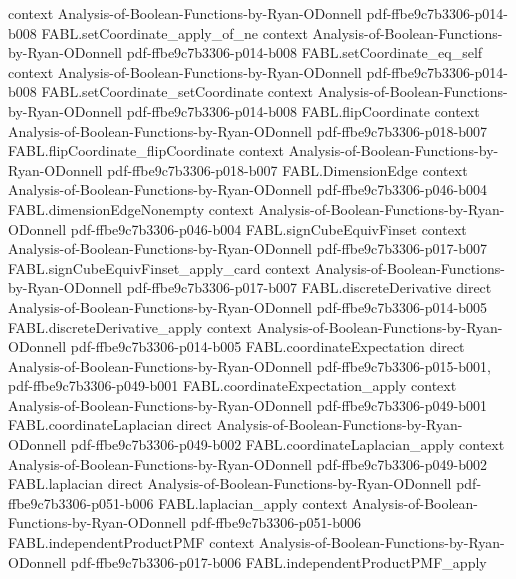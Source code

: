 \begin{theorem}
  {context}
  {Analysis-of-Boolean-Functions-by-Ryan-ODonnell}
  {pdf-ffbe9c7b3306-p014-b008}
\proofstep
  {FABL.setCoordinate_apply_of_ne}
  {context}
  {Analysis-of-Boolean-Functions-by-Ryan-ODonnell}
  {pdf-ffbe9c7b3306-p014-b008}
\proofstep
  {FABL.setCoordinate_eq_self}
  {context}
  {Analysis-of-Boolean-Functions-by-Ryan-ODonnell}
  {pdf-ffbe9c7b3306-p014-b008}
\proofstep
  {FABL.setCoordinate_setCoordinate}
  {context}
  {Analysis-of-Boolean-Functions-by-Ryan-ODonnell}
  {pdf-ffbe9c7b3306-p014-b008}
\proofstep
  {FABL.flipCoordinate}
  {context}
  {Analysis-of-Boolean-Functions-by-Ryan-ODonnell}
  {pdf-ffbe9c7b3306-p018-b007}
\proofstep
  {FABL.flipCoordinate_flipCoordinate}
  {context}
  {Analysis-of-Boolean-Functions-by-Ryan-ODonnell}
  {pdf-ffbe9c7b3306-p018-b007}
\proofstep
  {FABL.DimensionEdge}
  {context}
  {Analysis-of-Boolean-Functions-by-Ryan-ODonnell}
  {pdf-ffbe9c7b3306-p046-b004}
\proofstep
  {FABL.dimensionEdgeNonempty}
  {context}
  {Analysis-of-Boolean-Functions-by-Ryan-ODonnell}
  {pdf-ffbe9c7b3306-p046-b004}
\proofstep
  {FABL.signCubeEquivFinset}
  {context}
  {Analysis-of-Boolean-Functions-by-Ryan-ODonnell}
  {pdf-ffbe9c7b3306-p017-b007}
\proofstep
  {FABL.signCubeEquivFinset_apply_card}
  {context}
  {Analysis-of-Boolean-Functions-by-Ryan-ODonnell}
  {pdf-ffbe9c7b3306-p017-b007}
\proofstep
  {FABL.discreteDerivative}
  {direct}
  {Analysis-of-Boolean-Functions-by-Ryan-ODonnell}
  {pdf-ffbe9c7b3306-p014-b005}
\proofstep
  {FABL.discreteDerivative_apply}
  {context}
  {Analysis-of-Boolean-Functions-by-Ryan-ODonnell}
  {pdf-ffbe9c7b3306-p014-b005}
\proofstep
  {FABL.coordinateExpectation}
  {direct}
  {Analysis-of-Boolean-Functions-by-Ryan-ODonnell}
  {pdf-ffbe9c7b3306-p015-b001,
    pdf-ffbe9c7b3306-p049-b001}
\proofstep
  {FABL.coordinateExpectation_apply}
  {context}
  {Analysis-of-Boolean-Functions-by-Ryan-ODonnell}
  {pdf-ffbe9c7b3306-p049-b001}
\proofstep
  {FABL.coordinateLaplacian}
  {direct}
  {Analysis-of-Boolean-Functions-by-Ryan-ODonnell}
  {pdf-ffbe9c7b3306-p049-b002}
\proofstep
  {FABL.coordinateLaplacian_apply}
  {context}
  {Analysis-of-Boolean-Functions-by-Ryan-ODonnell}
  {pdf-ffbe9c7b3306-p049-b002}
\proofstep
  {FABL.laplacian}
  {direct}
  {Analysis-of-Boolean-Functions-by-Ryan-ODonnell}
  {pdf-ffbe9c7b3306-p051-b006}
\proofstep
  {FABL.laplacian_apply}
  {context}
  {Analysis-of-Boolean-Functions-by-Ryan-ODonnell}
  {pdf-ffbe9c7b3306-p051-b006}
\proofstep
  {FABL.independentProductPMF}
  {context}
  {Analysis-of-Boolean-Functions-by-Ryan-ODonnell}
  {pdf-ffbe9c7b3306-p017-b006}
\proofstep
  {FABL.independentProductPMF_apply}

\end{theorem}
